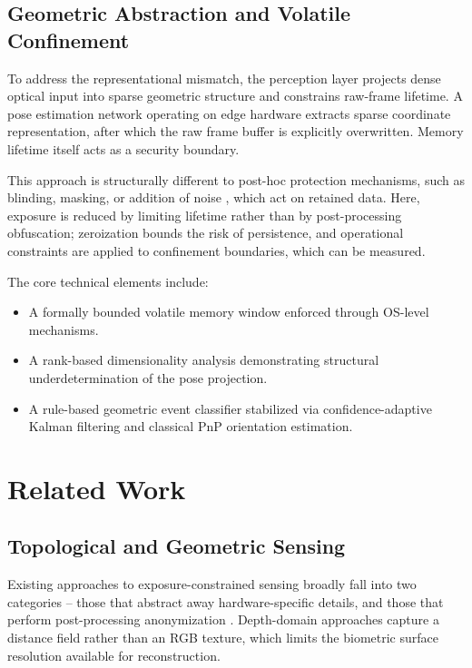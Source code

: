 \documentclass[conference]{IEEEtran}
\begin{document}
\subsection{Geometric Abstraction and Volatile Confinement}
To address the representational mismatch, the perception layer projects dense optical input into sparse geometric structure and constrains raw-frame lifetime. A pose estimation network operating on edge hardware extracts sparse coordinate representation, after which the raw frame buffer is explicitly overwritten. Memory lifetime itself acts as a security boundary.

This approach is structurally different to post-hoc protection mechanisms, such as blinding, masking, or addition of noise \cite{b3, b4}, which act on retained data. Here, exposure is reduced by limiting lifetime rather than by post-processing obfuscation; zeroization bounds the risk of persistence, and operational constraints are applied to confinement boundaries, which can be measured.

The core technical elements include:
\begin{itemize}
    \item A formally bounded volatile memory window enforced through OS-level mechanisms.
    \item A rank-based dimensionality analysis demonstrating structural underdetermination of the pose projection.
    \item A rule-based geometric event classifier stabilized via confidence-adaptive Kalman filtering \cite{b17} and classical PnP orientation estimation.
\end{itemize}

\section{Related Work}

\subsection{Topological and Geometric Sensing}
Existing approaches to exposure-constrained sensing broadly fall into two categories – those that abstract away hardware-specific details, and those that perform post-processing anonymization \cite{b5}. Depth-domain approaches capture a distance field rather than an RGB texture, which limits the biometric surface resolution available for reconstruction.
\end{document}
